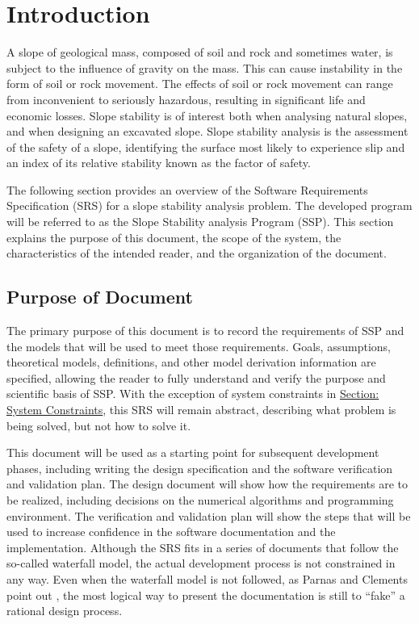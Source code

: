 \documentclass[12pt]{article}
\begin{document}
\section{Introduction}
\label{Sec:Intro}
A slope of geological mass, composed of soil and rock and sometimes water, is subject to the influence of gravity on the mass. This can cause instability in the form of soil or rock movement. The effects of soil or rock movement can range from inconvenient to seriously hazardous, resulting in significant life and economic losses. Slope stability is of interest both when analysing natural slopes, and when designing an excavated slope. Slope stability analysis is the assessment of the safety of a slope, identifying the surface most likely to experience slip and an index of its relative stability known as the factor of safety.

The following section provides an overview of the Software Requirements Specification (SRS) for a slope stability analysis problem. The developed program will be referred to as the Slope Stability analysis Program (SSP). This section explains the purpose of this document, the scope of the system, the characteristics of the intended reader, and the organization of the document.

\subsection{Purpose of Document}
\label{Sec:DocPurpose}
The primary purpose of this document is to record the requirements of SSP and the models that will be used to meet those requirements. Goals, assumptions, theoretical models, definitions, and other model derivation information are specified, allowing the reader to fully understand and verify the purpose and scientific basis of SSP. With the exception of system constraints in \hyperref[Sec:SysConstraints]{Section: System Constraints}, this SRS will remain abstract, describing what problem is being solved, but not how to solve it.

This document will be used as a starting point for subsequent development phases, including writing the design specification and the software verification and validation plan. The design document will show how the requirements are to be realized, including decisions on the numerical algorithms and programming environment. The verification and validation plan will show the steps that will be used to increase confidence in the software documentation and the implementation. Although the SRS fits in a series of documents that follow the so-called waterfall model, the actual development process is not constrained in any way. Even when the waterfall model is not followed, as Parnas and Clements point out \cite{parnasClements1986}, the most logical way to present the documentation is still to ``fake'' a rational design process.
\end{document}
